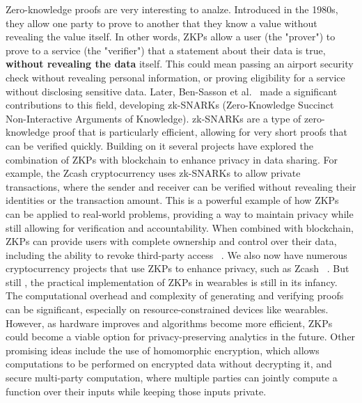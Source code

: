 	Zero-knowledge proofs are very interesting to analze. Introduced in the 1980s, they allow one party to prove to another that they know a value without revealing the value itself. In other words, ZKPs allow a user (the "prover") to prove to a service (the "verifier") that a statement about their data is true, \textbf{without revealing the data} itself. This could mean passing an airport security check without revealing personal information, or proving eligibility for a service without disclosing sensitive data. Later, Ben-Sasson et al.~\cite{BenSasson2019} made a significant contributions to this field, developing zk-SNARKs (Zero-Knowledge Succinct Non-Interactive Arguments of Knowledge). zk-SNARKs are a type of zero-knowledge proof that is particularly efficient, allowing for very short proofs that can be verified quickly. Building on it several projects have explored the combination of ZKPs with blockchain to enhance privacy in data sharing. For example, the Zcash cryptocurrency uses zk-SNARKs to allow private transactions, where the sender and receiver can be verified without revealing their identities or the transaction amount. This is a powerful example of how ZKPs can be applied to real-world problems, providing a way to maintain privacy while still allowing for verification and accountability. When combined with blockchain, ZKPs can provide users with complete ownership and control over their data, including the ability to revoke third-party access ~\cite{Zhou2023}. We also now have numerous cryptocurrency projects that use ZKPs to enhance privacy, such as Zcash ~\cite{BenSasson2014}. But still , the practical implementation of ZKPs in wearables is still in its infancy. The computational overhead and complexity of generating and verifying proofs can be significant, especially on resource-constrained devices like wearables. However, as hardware improves and algorithms become more efficient, ZKPs could become a viable option for privacy-preserving analytics in the future.
	Other promising ideas include the use of homomorphic encryption, which allows computations to be performed on encrypted data without decrypting it, and secure multi-party computation, where multiple parties can jointly compute a function over their inputs while keeping those inputs private. 


